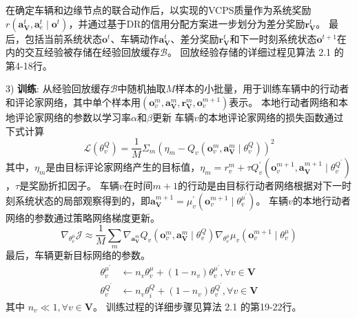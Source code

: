 在确定车辆和边缘节点的联合动作后，以实现的VCPS质量作为系统奖励$r\left(\boldsymbol{a}_{\mathbf{V}}^{t},\boldsymbol{a}_{e}^{t} \mid \boldsymbol{o}^{t}\right)$，并通过基于DR的信用分配方案进一步划分为差分奖励$\boldsymbol{r}_{\mathbf{V}}^{t}$。
最后，包括当前系统状态$\boldsymbol{o}^{t}$、车辆动作$\boldsymbol{a}_{\mathbf{V}}^{t}$、差分奖励$\boldsymbol{r}_{\mathbf{V}}^{t}$和下一时刻系统状态$\boldsymbol{o}^{t+1}$在内的交互经验被存储在经验回放缓存$\mathcal{B}$。
回放经验存储的详细过程见算法 2.1 的第4-18行。

3) \textbf{训练}: 从经验回放缓存$\mathcal{B}$中随机抽取$M$样本的小批量，用于训练车辆中的行动者和评论家网络，其中单个样本用$(\boldsymbol{o}_{v}^{m}, \boldsymbol{a}_{\mathbf{V}}^{m}, \boldsymbol{r}_{\mathbf{V}}^{m}, \boldsymbol{o}_{v}^{m+1})$表示。
本地行动者网络和本地评论家网络的参数以学习率$\alpha$和$\beta$更新
车辆$v$的本地评论家网络的损失函数通过下式计算
\begin{equation}
	\mathcal{L}\left(\theta_{v}^{Q}\right)=\frac{1}{M} \Sigma_{m}\left(\eta_{m}-Q_{v}\left(\boldsymbol{o}_{v}^{m}, \boldsymbol{a}_{\mathbf{V}}^{m} \mid \theta_{v}^{Q}\right)\right)^{2}
\end{equation}
\noindent 其中，$\eta_{m}$是由目标评论家网络产生的目标值，$\eta_{m}=r_{v}^{m}+\tau Q_{v}^{\prime}(\boldsymbol{o}_{v}^{m+1}, \boldsymbol{a}_{\mathbf{V}}^{m+1} \mid \theta_{v}^{Q^{\prime}})$，$\tau$是奖励折扣因子。
车辆$v$在时间$m+1$的行动是由目标行动者网络根据对下一时刻系统状态的局部观察得到的，即$\boldsymbol{a}_{\mathbf{V}}^{m+1}=\mu_{v}^{\prime}(\boldsymbol{o}_{v}^{m+1} \mid \theta_{v}^{\mu^{\prime}})$。
车辆$v$的本地行动者网络的参数通过策略网络梯度更新。
\begin{equation}
	\nabla_{\theta_{v}^{\mu}} \mathcal{J} \approx \frac{1}{M} \sum_{m} \nabla_{\boldsymbol{a}_{\mathbf{V}}^{m}} Q_{v}\left(\boldsymbol{o}_{v}^{m}, \boldsymbol{a}_{\mathbf{V}}^{m} \mid \theta_{v}^{Q}\right) \nabla_{\theta_{v}^{\mu}} \mu_{v}\left(\boldsymbol{o}_{v}^{m+1} \mid \theta_{v}^{\mu}\right)
\end{equation}
最后，车辆更新目标网络的参数。
\begin{align}
	\theta_{v}^{\mu^{\prime}} &\leftarrow n_{v} \theta_{v}^{\mu}+(1-n_{v})  \theta_{v}^{\mu^{\prime}}, \forall v \in \mathbf{V}\\
	\theta_{v}^{Q^{\prime}} &\leftarrow n_{v} \theta_{i}^{Q}+(1-n_{v})  \theta_{v}^{Q^{\prime}}, \forall v \in \mathbf{V}
\end{align}
\noindent 其中 $n_{v} \ll 1, \forall v \in \mathbf{V} $。
训练过程的详细步骤见算法 2.1 的第19-22行。

